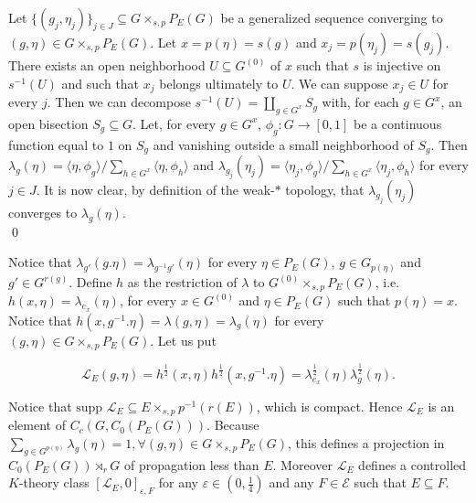 \begin{dem}
Let $\{(g_j,\eta_j)\}_{j\in J}\subseteq G\times_{s,p}P_E(G)$ be a generalized sequence converging to $(g,\eta)\in G\times_{s,p}P_E(G)$. Let $x=p(\eta) = s(g)$ and $x_j=p(\eta_j) = s(g_j)$. There exists an open neighborhood $U\subseteq G^{(0)}$ of $x$ such that $s$ is injective on $s^{-1}(U)$ and such that $x_j$ belongs ultimately to $U$. We can suppose $x_j\in U$ for every $j$. Then we can decompose $s^{-1}(U) = \coprod_{g\in G^x} S_g$ with, for each $g\in G^x$, an open bisection $S_g\subseteq G$. Let, for every $g\in G^x$, $\phi_g : G\rightarrow [0,1]$ be a continuous function equal to $1$ on $S_g$ and vanishing outside a small neighborhood of $S_g$. Then $\lambda_g(\eta) = \langle \eta,\phi_g\rangle / \sum_{h\in G^x}\langle \eta,\phi_h\rangle$ and $\lambda_{g_j}(\eta_j) = \langle \eta_j,\phi_g\rangle / \sum_{h\in G^x}\langle \eta_j,\phi_h\rangle$ for every $j\in J$. It is now clear, by definition of the weak-$*$ topology, that $\lambda_{g_j}(\eta_j)$ converges to $\lambda_{g}(\eta)$.  \\
\qed
\end{dem}

Notice that $\lambda_{g'}(g.\eta) = \lambda_{g^{-1}g'}(\eta)$ for every $\eta\in P_E(G)$, $g\in G_{p(\eta)}$ and $g'\in G^{r(g)}$. Define $h$ as the restriction of $\lambda$ to $G^{(0)}\times_{s,p}P_E(G)$, i.e. $h(x,\eta) = \lambda_{e_x}(\eta)$, for every $x\in G^{(0)}$ and $\eta\in P_E(G)$ such that $p(\eta) = x$. Notice that $h(x,g^{-1}.\eta)= \lambda(g,\eta) = \lambda_g(\eta)$ for every $(g,\eta)\in G\times_{s,p} P_E(G)$. Let us put
 
\[\mathcal L_E(g,\eta) = h^{\frac{1}{2}}(x,\eta) h^{\frac{1}{2}}(x,g^{-1}.\eta)= \lambda_{e_x}^{\frac{1}{2}}(\eta)\lambda_g^{\frac{1}{2}}(\eta).\] 

Notice that $\text{supp }\mathcal L_E\subseteq E\times_{s,p} p^{-1}(r(E))$, which is compact. Hence $\mathcal L_E$ is an element of $C_c(G,C_0(P_E(G)))$. Because $\sum_{g\in G^{p(\eta)}}\lambda_g(\eta) = 1 ,\forall (g,\eta)\in G\times_{s,p} P_E(G)$, this defines a projection in $C_0(P_E(G))\rtimes_r G$ of propagation less than $E$. Moreover $\mathcal L_E$ defines a controlled $K$-theory class $[\mathcal L_E,0]_{\varepsilon,F}$ for any $\varepsilon\in (0,\frac{1}{4})$ and any $F\in \mathcal E$ such that $E\subseteq F$.\\ %

